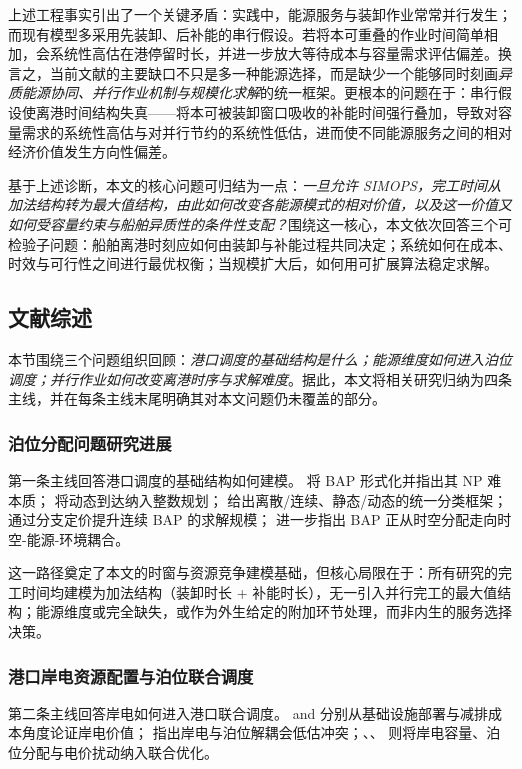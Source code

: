 \documentclass[UTF8, a4paper, 12pt]{ctexart}
\theoremstyle{plain}
\theoremstyle{definition}
\theoremstyle{remark}
\begin{document}
上述工程事实引出了一个关键矛盾：实践中，能源服务与装卸作业常常并行发生；而现有模型多采用先装卸、后补能的串行假设。若将本可重叠的作业时间简单相加，会系统性高估在港停留时长，并进一步放大等待成本与容量需求评估偏差。换言之，当前文献的主要缺口不只是多一种能源选择，而是缺少一个能够同时刻画\emph{异质能源协同、并行作业机制与规模化求解}的统一框架。更根本的问题在于：串行假设使离港时间结构失真——将本可被装卸窗口吸收的补能时间强行叠加，导致对容量需求的系统性高估与对并行节约的系统性低估，进而使不同能源服务之间的相对经济价值发生方向性偏差。
 
基于上述诊断，本文的核心问题可归结为一点：\emph{一旦允许 SIMOPS，完工时间从加法结构转为最大值结构，由此如何改变各能源模式的相对价值，以及这一价值又如何受容量约束与船舶异质性的条件性支配？}围绕这一核心，本文依次回答三个可检验子问题：船舶离港时刻应如何由装卸与补能过程共同决定；系统如何在成本、时效与可行性之间进行最优权衡；当规模扩大后，如何用可扩展算法稳定求解。
\subsection{文献综述}
\label{sec:lit_review}
 
本节围绕三个问题组织回顾：\emph{港口调度的基础结构是什么；能源维度如何进入泊位调度；并行作业如何改变离港时序与求解难度}。据此，本文将相关研究归纳为四条主线，并在每条主线末尾明确其对本文问题仍未覆盖的部分。
 
\subsubsection{泊位分配问题研究进展}
 
第一条主线回答港口调度的基础结构如何建模。\citet{Lim1998} 将 BAP 形式化并指出其 NP 难本质；\citet{Imai2001} 将动态到达纳入整数规划；\citet{Bierwirth2010} 给出离散/连续、静态/动态的统一分类框架；\citet{Correcher2019} 通过分支定价提升连续 BAP 的求解规模；\citet{Rodrigues2022} 进一步指出 BAP 正从时空分配走向时空-能源-环境耦合。
 
这一路径奠定了本文的时窗与资源竞争建模基础，但核心局限在于：所有研究的完工时间均建模为加法结构（装卸时长 + 补能时长），无一引入并行完工的最大值结构；能源维度或完全缺失，或作为外生给定的附加环节处理，而非内生的服务选择决策。
 
\subsubsection{港口岸电资源配置与泊位联合调度}
 
第二条主线回答岸电如何进入港口联合调度。\citet{Winkel2016} and \citet{Zis2014} 分别从基础设施部署与减排成本角度论证岸电价值；\citet{Iris2019} 指出岸电与泊位解耦会低估冲突；\citet{Peng2021}、\citet{Yu2022_SP}、\citet{Zou2024} 则将岸电容量、泊位分配与电价扰动纳入联合优化。
 
\end{document}
